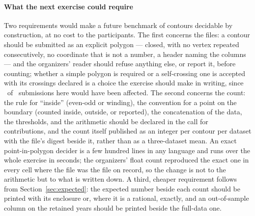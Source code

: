 \documentclass[preprint,11pt,authoryear]{elsarticle}
\begin{document}
\paragraph{What the next exercise could require}
Two requirements would make a future benchmark of contours decidable by construction, at no cost to the participants. The first concerns the files: a contour should be submitted as an explicit polygon --- closed, with no vertex repeated consecutively, no coordinate that is not a number, a header naming the columns --- and the organizers' reader should refuse anything else, or report it, before counting; whether a simple polygon is required or a self-crossing one is accepted with its crossings declared is a choice the exercise should make in writing, since \ENotSimple\ of \EContours\ submissions here would have been affected. The second concerns the count: the rule for ``inside'' (even-odd or winding), the convention for a point on the boundary (counted inside, outside, or reported), the concatenation of the data, the thresholds, and the arithmetic should be declared in the call for contributions, and the count itself published as an integer per contour per dataset with the file's digest beside it, rather than as a three-dataset mean. An exact point-in-polygon decider is a few hundred lines in any language and runs over the whole exercise in seconds; the organizers' float count reproduced the exact one in every cell where the file was the file on record, so the change is not to the arithmetic but to what is written down. A third, cheaper requirement follows from Section~\ref{sec:expected}: the expected number beside each count should be printed with its enclosure or, where it is a rational, exactly, and an out-of-sample column on the retained years should be printed beside the full-data one.
\end{document}
